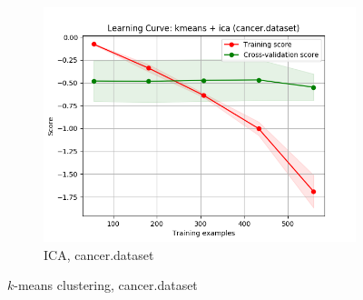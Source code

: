 \documentclass{article}
\begin{document}
\begin{figure}[htb]
\begin{subfigure}{0.33\textwidth}
        \includegraphics[width=\linewidth]{out/cluster_dr/cancer-kmeans-ica-learning.png}
        \caption{ICA, cancer.dataset}
      \end{subfigure} 

    \caption{$k$-means clustering, cancer.dataset}
    \label{fig:cdr-plot-km-cancer}
    \end{figure}
\end{document}
